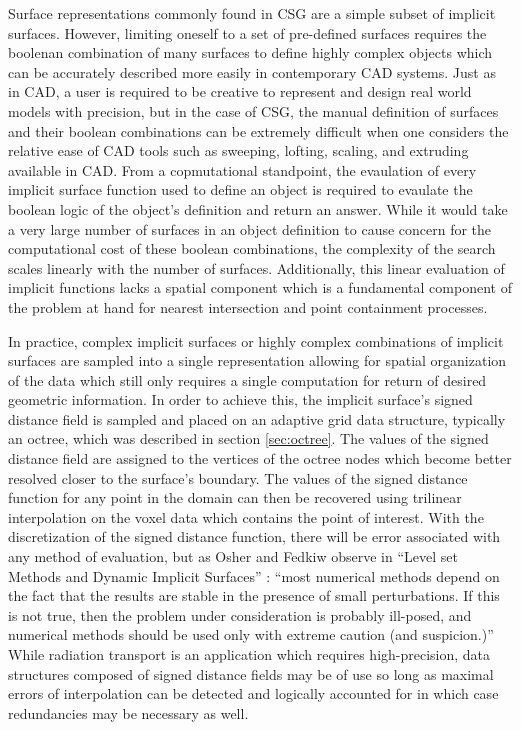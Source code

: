 \documentclass[12pt, a4paper]{article}
\begin{document}
Surface representations commonly found in CSG are a simple subset of implicit surfaces. However, limiting oneself to a set of pre-defined surfaces requires the boolenan combination of many surfaces to define highly complex objects which can be accurately described more easily in contemporary CAD systems. Just as in CAD, a user is required to be creative to represent and design real world models with precision, but in the case of CSG, the manual definition of surfaces and their boolean combinations can be extremely difficult when one considers the relative ease of CAD tools such as sweeping, lofting, scaling, and extruding available in CAD. From a copmutational standpoint, the evaulation of every implicit surface function used to define an object is required to evaulate the boolean logic of the object's definition and return an answer. While it would take a very large number of surfaces in an object definition to cause concern for the computational cost of these boolean combinations, the complexity of the search scales linearly with the number of surfaces. Additionally, this linear evaluation of implicit functions lacks a spatial component which is a fundamental component of the problem at hand for nearest intersection and point containment processes.

In practice, complex implicit surfaces or highly complex combinations of implicit surfaces are sampled into a single representation allowing for spatial organization of the data which still only requires a single computation for return of desired geometric information. In order to achieve this, the implicit surface's signed distance field is sampled and placed on an adaptive grid data structure, typically an octree, which was described in section \ref{sec:octree}. The values of the signed distance field are assigned to the vertices of the octree nodes which become better resolved closer to the surface's boundary. The values of the signed distance function for any point in the domain can then be recovered using trilinear interpolation on the voxel data which contains the point of interest. With the discretization of the signed distance function, there will be error associated with any method of evaluation, but as Osher and Fedkiw observe in ``Level set Methods and Dynamic Implicit Surfaces'' \cite{Osher_2003}: ``most numerical methods depend on the fact that the results are stable in the presence of small perturbations. If this is not true, then the problem under consideration is probably ill-posed, and numerical methods should be used only with extreme caution (and suspicion.)'' While radiation transport is an application which requires high-precision, data structures composed of signed distance fields may be of use so long as maximal errors of interpolation can be detected and logically accounted for in which case redundancies may be necessary as well.
\end{document}

